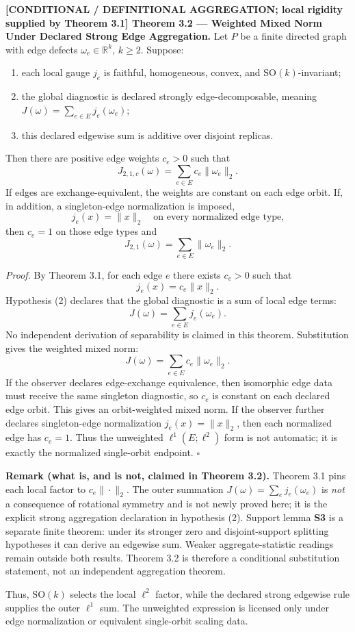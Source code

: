 \documentclass[
  11pt,
]{article}
\providecommand{\tightlist}{%
  \setlength{\itemsep}{0pt}\setlength{\parskip}{0pt}}
\providecommand{\tightlist}{%
  \setlength{\itemsep}{0pt}\setlength{\parskip}{0pt}}
\renewenvironment{quote}
  {\begin{leftbar}\small}
  {\end{leftbar}}
\begin{document}
\textbf{{[}CONDITIONAL / DEFINITIONAL AGGREGATION; local rigidity
supplied by Theorem 3.1{]} Theorem 3.2 --- Weighted Mixed Norm Under
Declared Strong Edge Aggregation.} Let \(P\) be a finite directed graph
with edge defects \(\omega_e\in\mathbb R^k\), \(k\ge2\). Suppose:

\begin{enumerate}
\def\labelenumi{\arabic{enumi}.}
\tightlist
\item
  each local gauge \(j_e\) is faithful, homogeneous, convex, and
  \(\mathrm{SO}(k)\)-invariant;
\item
  the global diagnostic is declared strongly edge-decomposable, meaning
  \(J(\omega)=\sum_{e\in E}j_e(\omega_e)\);
\item
  this declared edgewise sum is additive over disjoint replicas.
\end{enumerate}

Then there are positive edge weights \(c_e>0\) such that \[
J_{2,1,c}(\omega)=
\sum_{e\in E}c_e\|\omega_e\|_2.
\] If edges are exchange-equivalent, the weights are constant on each
edge orbit. If, in addition, a singleton-edge normalization is imposed,
\[
j_e(x)=\|x\|_2
\quad\text{on every normalized edge type,}
\] then \(c_e=1\) on those edge types and \[
J_{2,1}(\omega)=\sum_{e\in E}\|\omega_e\|_2.
\]

\emph{Proof.} By Theorem 3.1, for each edge \(e\) there exists \(c_e>0\)
such that \[
j_e(x)=c_e\|x\|_2.
\] Hypothesis (2) declares that the global diagnostic is a sum of local
edge terms: \[
J(\omega)=\sum_{e\in E}j_e(\omega_e).
\] No independent derivation of separability is claimed in this theorem.
Substitution gives the weighted mixed norm: \[
J(\omega)=\sum_{e\in E}c_e\|\omega_e\|_2.
\] If the observer declares edge-exchange equivalence, then isomorphic
edge data must receive the same singleton diagnostic, so \(c_e\) is
constant on each declared edge orbit. This gives an orbit-weighted mixed
norm. If the observer further declares singleton-edge normalization
\(j_e(x)=\|x\|_2\), then each normalized edge has \(c_e=1\). Thus the
unweighted \(\ell^1(E;\ell^2)\) form is not automatic; it is exactly the
normalized single-orbit endpoint. \(\square\)

\begin{quote}
\textbf{Remark (what is, and is not, claimed in Theorem 3.2).} Theorem
3.1 pins each local factor to \(c_e\|\cdot\|_2\). The outer summation
\(J(\omega)=\sum_e j_e(\omega_e)\) is \emph{not} a consequence of
rotational symmetry and is not newly proved here; it is the explicit
strong aggregation declaration in hypothesis (2). Support lemma
\textbf{S3} is a separate finite theorem: under its stronger zero and
disjoint-support splitting hypotheses it can derive an edgewise sum.
Weaker aggregate-statistic readings remain outside both results. Theorem
3.2 is therefore a conditional substitution statement, not an
independent aggregation theorem.

Thus, \(\mathrm{SO}(k)\) selects the local \(\ell^2\) factor, while the
declared strong edgewise rule supplies the outer \(\ell^1\) sum. The
unweighted expression is licensed only under edge normalization or
equivalent single-orbit scaling data.
\end{quote}
\end{document}
